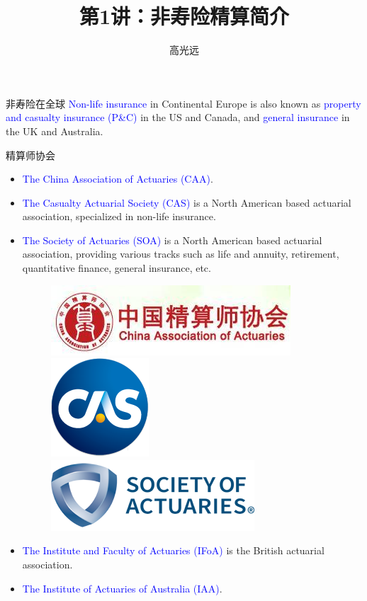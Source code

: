 \documentclass[professionalfont]{beamer}
\title{第1讲：非寿险精算简介}
\author{高光远}
\institute{中国人民大学~统计学院}
\date{}
\newcommand{\blue}[1]{\textcolor{blue}{#1}}
\begin{document}
\begin{frame}
	\titlepage
\end{frame}



\begin{frame}{非寿险在全球}
\blue{Non-life insurance} in Continental Europe is also known as \blue{property and casualty insurance (P\&C)} in the US and Canada, and \blue{general insurance} in the UK and Australia. 
\end{frame}

\begin{frame}{精算师协会}
\begin{itemize}
\item \blue{The China Association of Actuaries (CAA)}.
\item \blue{The Casualty Actuarial Society (CAS)} is a North American based actuarial association, specialized in non-life insurance.
\item \blue{The Society of Actuaries (SOA)} is a North American based actuarial association, providing various tracks such as life and annuity, retirement, quantitative finance, general insurance, etc.  
\begin{figure}
\centering
\includegraphics[height=0.1\linewidth]{Plots/caa.jpg}~~
\includegraphics[height=0.1\linewidth]{Plots/logo.png}~~
\includegraphics[height=0.1\linewidth]{Plots/soa.png}
\end{figure}
\item \blue{The Institute and Faculty of Actuaries (IFoA)} is the British actuarial association.
\item \blue{The Institute of Actuaries of Australia (IAA)}.
\end{itemize}
\end{frame}
\end{document}
